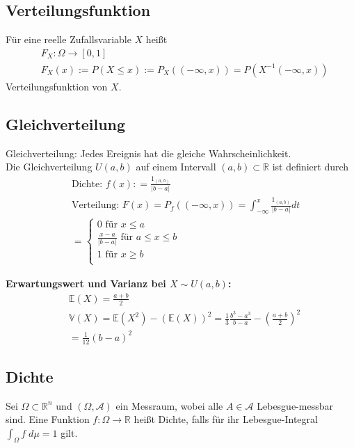 \documentclass[a4paper]{article}
\begin{document}
\subsection{Verteilungsfunktion}
Für eine reelle Zufallsvariable $X$ heißt 
\begin{align*} 
& F_X : \Omega \to [0,1] \\
& F_X (x) := P (X \leq x) := P_X (( -\infty, x )) = P(X^{-1} (-\infty, x))
\end{align*}
Verteilungsfunktion von $X$.

\subsection{Gleichverteilung}
Gleichverteilung: Jedes Ereignis hat die gleiche Wahrscheinlichkeit. \\
Die Gleichverteilung $U{(a,b)}$ auf einem Intervall $(a,b) \subset \mathbb{R}$ ist definiert durch
\begin{align*}
& \text{Dichte: } f (x) : = \frac{1_{(a,b)}}{|b-a| } \\
& \text{Verteilung: } F (x) =  P_f( (-\infty, x))  =  \int_{-\infty}^{x} \frac{1_{(a,b)}}{|b-a|} dt\\\
& = \begin {cases} 0 \text{ für } x \leq a \\   \frac{x-a}{|b-a|} \text{ für } a \leq x \leq b \\ 1 \text{ für }  x \geq b \\  \end{cases}
\end{align*}

\textbf{Erwartungswert und Varianz bei $X \sim U(a,b)$:}
\begin{align*}
& \mathbb{E}(X) = \frac{a+b}2 \\
& \mathbb{V}(X) = \mathbb{E}(X^2) - \left({\mathbb{E}(X)} \right)^2  = \frac{1}{3}\frac{b^3  - a^3}{b - a} - \left( {\frac{a + b}{2}} \right)^2 \\
    &= \frac{1}{12}(b - a)^2
\end{align*}

\subsection{Dichte}
Sei $\Omega \subset \mathbb{R}^n$ und $(\Omega, \mathcal{A})$ ein Messraum, wobei alle $A \in \mathcal{A}$ Lebesgue-messbar sind.
 Eine Funktion $f: \Omega \to \mathbb{R}$ heißt Dichte, falls für ihr Lebesgue-Integral $\int_{\Omega} f \; d \mu = 1$ gilt.
\end{document}
